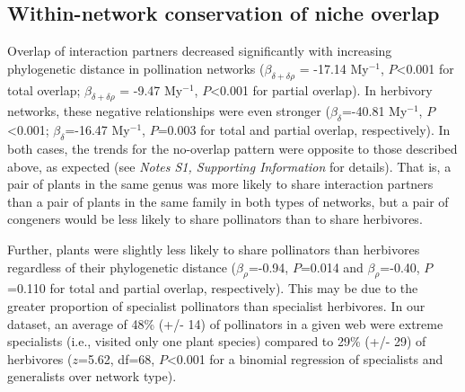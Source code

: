 \documentclass[12pt]{article}
\begin{document}
\begin{spacing}{1.5}
  \subsection*{Within-network conservation of niche overlap}

    Overlap of interaction partners decreased significantly with 
    increasing phylogenetic distance in pollination networks
    ($\beta_{\delta + \delta\rho}$ = -17.14 My$^{-1}$, $P$\textless0.001 
    for total overlap; $\beta_{\delta + \delta\rho}$ = -9.47 My$^{-1}$, 
    $P$\textless0.001 for partial overlap). In herbivory networks,
    these negative relationships were even stronger
    ($\beta_{\delta}$=-40.81 My$^{-1}$, $P$\textless0.001; 
    $\beta_{\delta}$=-16.47 My$^{-1}$, $P$=0.003 for total and 
    partial overlap, respectively). In both cases, the trends 
    for the no-overlap pattern were opposite to those described above, 
    as expected (see \emph{Notes S1, Supporting Information} for details).
    That is, a pair of plants in the same genus was more likely to share 
    interaction partners than a pair of plants in the same family in both types 
    of networks, but a pair of congeners would be less likely to share pollinators
    than to share herbivores.


    Further, plants were slightly less likely to share pollinators than herbivores 
    regardless of their phylogenetic distance ($\beta_{\rho}$=-0.94, 
    $P$=0.014 and $\beta_{\rho}$=-0.40, $P$=0.110 for total and partial 
    overlap, respectively). This may be due to the greater proportion of
    specialist pollinators than specialist herbivores. In our dataset, an
    average of 48\% (+/- 14) of pollinators in a given web were extreme 
    specialists (i.e., visited only one plant species) compared to 29\% 
    (+/- 29) of herbivores ($z$=5.62, df=68, $P$\textless0.001 
    for a binomial regression of specialists and generalists over network
    type).



\end{spacing}
\end{document}
